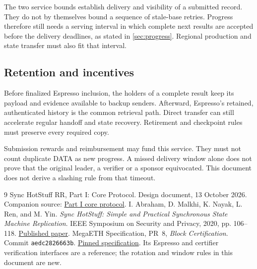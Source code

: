 \documentclass[11pt,a4paper]{article}
\newcounter{protocol}
\begin{document}
The two service bounds establish delivery and visibility of a submitted
record. They do not by themselves bound a sequence of stale-base retries.
Progress therefore still needs a serving interval in which complete next
results are accepted before the delivery deadlines, as stated in
\cref{sec:progress}. Regional production and state transfer must also fit
that interval.

\subsection{Retention and incentives}
Before finalized Espresso inclusion, the holders of a complete result
keep its payload and evidence available to backup senders. Afterward,
Espresso's retained, authenticated history is the common retrieval path.
Direct transfer can still accelerate regular handoff and state recovery.
Retirement and checkpoint rules must preserve every required copy.

Submission rewards and reimbursement may fund this service. They must not
count duplicate DATA as new progress. A missed delivery window alone does
not prove that the original leader, a verifier or a sponsor equivocated.
This document does not derive a slashing rule from that timeout.

\begingroup\small
\begin{thebibliography}{9}
Sync HotStuff RR, Part I: Core Protocol. Design document, 13 October 2026.
Companion source: \href{run:sync_hotstuff_rr_part1_core.tex}{Part I core protocol}.
I. Abraham, D. Malkhi, K. Nayak, L. Ren, and M. Yin.
\emph{Sync HotStuff: Simple and Practical Synchronous State Machine Replication}.
IEEE Symposium on Security and Privacy, 2020, pp. 106--118.
\href{https://conferences.computer.org/sp/pdfs/sp/2020/349700a106.pdf}{Published paper}.
MegaETH Specification, PR~8, \emph{Block Certification}.
Commit \texttt{aedc2826663b}.
\href{https://github.com/megaeth-labs/specification/tree/aedc2826663b134ee25d26bea17e70c6d23d321c/specs/block-certification}{Pinned specification}.
Its Espresso and certifier verification interfaces are a reference;
the rotation and window rules in this document are new.
\end{thebibliography}
\endgroup
\end{document}
